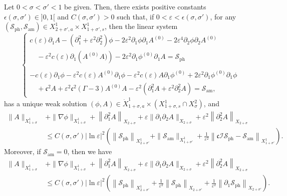 \documentclass[10pt]{amsart}
\theoremstyle{definition}\newtheorem{defi}[theo]{Definition}\newtheorem{rema}[theo]{Remark}\newtheorem{exam}[theo]{Example}\newtheorem{exem}[theo]{Example}\newtheorem{nota}[theo]{Notation}
\newcommand*\p{\partial}
\newcommand{\amm}{\mathrm{am}}
\newcommand{\phl}{\mathrm{ph}}
\newcommand*\BI{\mathcal{I}}
\newcommand*\BS{\mathcal{S}}
\newcommand*\cs{{\mathfrak c}}
\newcommand*\ls{\leqslant }
\newcommand*\e{\varepsilon}
\newcommand*\ep{\epsilon}
\newcommand*\lne{\lvert \ln \varepsilon \rvert}
\newcommand*\s{\sigma}
\begin{document}
\begin{prop}\label{esti-apriori}
Let $ 0 < \s < \s' < 1 $ be given. Then, there exists positive constants $ \ep (\s, \s') \in]0,1[$ and $ C (\s, \s') > 0 $ such that, if $ 0 < \e < \ep(\s, \s') $, for any $ (\BS_{\phl}, \BS_{\amm})
\in X^{1}_{2+\s', a} \times X^{1}_{1+\s', s} $, then the linear system
\begin{equation}\label{Mad_lineaire}
\left\{
\begin{array}{ll}
c(\e) \p_{1} A - \left(\p_{1}^2 + \e^2 \p^2_{2}\right) \phi - 2 \e^2 \p_{1} \phi \p_{1} A^{(0)} - 2 \e^4 \p_{2} \phi \p_{2} A^{(0)}
\\
\quad - \e^2 c(\e) \p_1 \left(A^{(0)} A)\right) - 2 \e^2 \p_{1} \phi^{(0)} \p_{1} A = \BS_{\phl} \\ \ \\
- c(\e) \p_{1} \phi - \e^2 c(\e) A^{(0)} \p_1 \phi - \e^2 c(\e) A \p_1 \phi^{(0)} + 2 \e^2 \p_{1} \phi^{(0)} \p_{1} \phi
\\
\quad + \cs^2 A + \e^2 \cs^2 (\Gamma -3) A^{(0)} A - \e^2 \left(\p_{1}^2 A + \e^2 \p_{2}^2 A\right) = \BS_{\amm},
\end{array}\right.
\end{equation}
has a unique weak solution $ (\phi, A) \in \dot{X}^{1}_{ 1+\s,a} \times (X^{1}_{ 1+ \s, s} \cap X^2_\s) $, and
\begin{align*}
\| A \|_{ X^{1}_{ 1+ \s} } & + \| \nabla \phi \|_{ X^{1}_{1 + \s} } + \left\| \p_1^2 A \right\|_{ X_{2 +\s} } + \e \| \p_1 \p_2 A \|_{ X_{2 +\s} } + \e^2 \left\| \p_2^2 A \right\|_{ X_{2+\s} }
\\ & \ls C (\s,\s') \lne^2
\left(
\left\| \BS_{\phl} \right\|_{ X^{1}_{ 2+\s'} } + \| \BS_{\amm} \|_{ X^{ 1}_{1+ \s'} } + \frac{1}{\e^2} \left\| \cs \BI \BS_{\phl} - \BS_{\amm} \right\|_{ X^{1}_{1+\s'} }
\right).
\end{align*}
Moreover, if $ \BS_{\amm} = 0 $, then we have
\begin{align*}
\| A \|_{ X^{1}_{ 1+\s} } & + \| \nabla \phi \|_{ X^{1}_{ 1 +\s} } + \left\| \p_1^2 A \right\|_{ X_{2 +\s} } + \e \| \p_1 \p_2 A \|_{ X_{2 +\s} } + \e^2 \left\| \p_2^2 A \right\|_{ X_{2+\s} }
\\& \ls C (\s, \s') \lne^2
\left(
\left\| \BS_{\phl} \right\|_{ X^{1}_{2+\s' } } + \frac{1}{\e^2} \left\| \BS_{\phl} \right\|_{ X_{ 2 + \s' } } + \frac{1}{\e^2} \left\| \p_1 \BS_{\phl} \right\|_{ X_{ 2 + \s' } }
\right).
\end{align*}
\end{prop}
\end{document}
